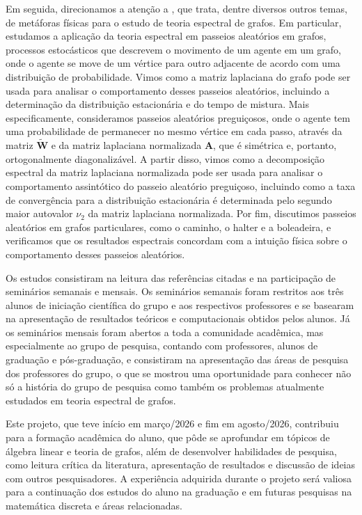 \documentclass{article}
\begin{document}
Em seguida, direcionamos a atenção a \cite{spielman}, que trata, dentre diversos outros temas, de metáforas físicas para o estudo de teoria espectral de grafos. Em particular, estudamos a aplicação da teoria espectral em passeios aleatórios em grafos, processos estocásticos que descrevem o movimento de um agente em um grafo, onde o agente se move de um vértice para outro adjacente de acordo com uma distribuição de probabilidade. Vimos como a matriz laplaciana do grafo pode ser usada para analisar o comportamento desses passeios aleatórios, incluindo a determinação da distribuição estacionária e do tempo de mistura. Mais especificamente, consideramos passeios aleatórios preguiçosos, onde o agente tem uma probabilidade de permanecer no mesmo vértice em cada passo, através da matriz \(\widetilde{\mathbf{W}}\) e da matriz laplaciana normalizada \(\mathbf{A}\), que é simétrica e, portanto, ortogonalmente diagonalizável. A partir disso, vimos como a decomposição espectral da matriz laplaciana normalizada pode ser usada para analisar o comportamento assintótico do passeio aleatório preguiçoso, incluindo como a taxa de convergência para a distribuição estacionária é determinada pelo segundo maior autovalor \(\nu_2\) da matriz laplaciana normalizada. Por fim, discutimos passeios aleatórios em grafos particulares, como o caminho, o halter e a boleadeira, e verificamos que os resultados espectrais concordam com a intuição física sobre o comportamento desses passeios aleatórios.

Os estudos consistiram na leitura das referências citadas e na participação de seminários semanais e mensais. Os seminários semanais foram restritos aos três alunos de iniciação científica do grupo e aos respectivos professores e se basearam na apresentação de resultados teóricos e computacionais obtidos pelos alunos. Já os seminários mensais foram abertos a toda a comunidade acadêmica, mas especialmente ao grupo de pesquisa, contando com professores, alunos de graduação e pós-graduação, e consistiram na apresentação das áreas de pesquisa dos professores do grupo, o que se mostrou uma oportunidade para conhecer não só a história do grupo de pesquisa como também os problemas atualmente estudados em teoria espectral de grafos.

Este projeto, que teve início em março/2026 e fim em agosto/2026, contribuiu para a formação acadêmica do aluno, que pôde se aprofundar em tópicos de álgebra linear e teoria de grafos, além de desenvolver habilidades de pesquisa, como leitura crítica da literatura, apresentação de resultados e discussão de ideias com outros pesquisadores. A experiência adquirida durante o projeto será valiosa para a continuação dos estudos do aluno na graduação e em futuras pesquisas na matemática discreta e áreas relacionadas.

\printbibliography
\end{document}
